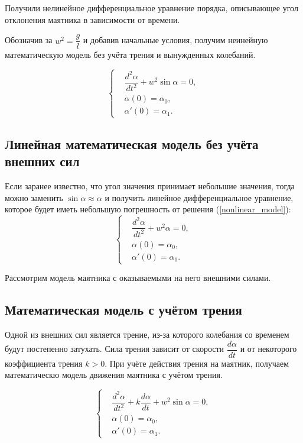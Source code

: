 		Получили нелинейное дифференциальное уравнение  порядка, описывающее угол отклонения маятника в зависимости от времени.

		Обозначив за \( w^2 = \dfrac{g}{l} \) и добавив начальные условия, получим неинейную математическую модель без учёта трения и вынужденных колебаний.

		\begin{equation}
			\begin{cases}
				& \dfrac{d^2 \alpha}{dt^2} + w^2 \sin \alpha = 0, \\
				& \alpha(0) = \alpha_0, \\
				& \alpha'(0) = \alpha_1.
			\end{cases} \label{nonlinear_model}
		\end{equation}

	\subsection{Линейная математическая модель без учёта внешних сил}

		Если заранее известно, что угол значения принимает небольшие значения, тогда можно заменить \( \sin \alpha \approx \alpha \) и получить линейное дифференциальное уравнение, которое будет иметь небольшую погрешность от решения (\ref{nonlinear_model}):
		\begin{equation}
			\begin{cases}
				& \dfrac{d^2 \alpha}{dt^2} + w^2  \alpha = 0, \\
				& \alpha(0) = \alpha_0, \\
				& \alpha'(0) = \alpha_1.
			\end{cases}
		\end{equation}

	
	Рассмотрим модель маятника с оказываемыми на него внешними силами.

	\subsection{Математическая модель с учётом трения}

		Одной из внешних сил является трение, из-за которого колебания со временем будут постепенно затухать. Сила трения зависит от скорости \( \dfrac{d \alpha}{dt} \) и от некоторого коэффициента трения \( k > 0 \). При учёте действия трения на маятник, получаем математическю модель движения маятника с учётом трения.

		\begin{equation}
			\begin{cases}
				& \dfrac{d^2 \alpha}{dt^2} +  k \dfrac{d \alpha}{dt} + w^2 \sin \alpha = 0, \\
				& \alpha(0) = \alpha_0, \\
				& \alpha'(0) = \alpha_1.
			\end{cases} 
		\end{equation}

